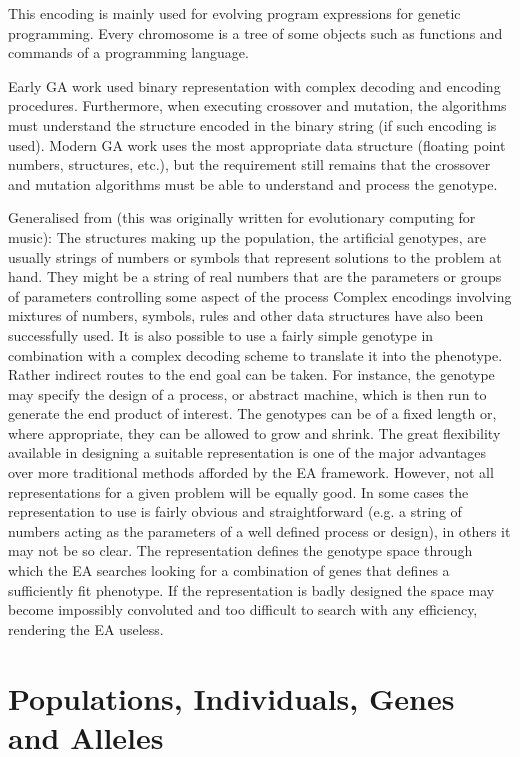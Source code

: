 This encoding is mainly used for evolving program expressions for genetic programming.
Every chromosome is a tree of some objects such as functions and commands
of a programming language.

Early GA work used binary representation with complex decoding and encoding procedures. Furthermore, when executing crossover and mutation, the algorithms must understand the structure encoded in the binary string (if such encoding is used). Modern GA work uses the most appropriate data structure (floating point numbers, structures, etc.), but the requirement still remains that the crossover and mutation algorithms must be able to understand and process the genotype.


Generalised from \cite{Husbands2007} (this was originally written for evolutionary computing for music):
The structures making up the population, the artificial genotypes, are usually strings
of numbers or symbols that represent solutions to the problem at hand. They might be
a string of real numbers that are the parameters or groups of parameters controlling some aspect of the process
Complex encodings involving mixtures of numbers, symbols, rules and other
data structures have also been successfully used. It is also possible to use a fairly simple genotype in
combination with a complex decoding scheme to translate it into the phenotype.
Rather indirect routes to the end goal can be taken. For instance, the genotype may
specify the design of a process, or abstract machine, which is then run to generate the
end product of interest. The genotypes can be of a fixed length
or, where appropriate, they can be allowed to grow and shrink. The great flexibility
available in designing a suitable representation is one of the major advantages over
more traditional methods afforded by the EA framework. However, not all
representations for a given problem will be equally good. In some cases the
representation to use is fairly obvious and straightforward (e.g. a string of numbers
acting as the parameters of a well defined process or design), in others it may not be
so clear. The representation defines the genotype space through which the EA
searches looking for a combination of genes that defines a sufficiently fit phenotype.
If the representation is badly designed the space may become impossibly convoluted
and too difficult to search with any efficiency, rendering the EA useless. 

\section{Populations, Individuals, Genes and Alleles}

